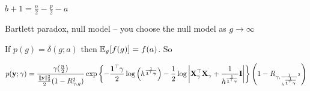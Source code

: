 \documentclass{amsart}
\begin{document}
$b + 1 = \frac{n}{2} - \frac{p}{2} - a$

Bartlett paradox, null model -- you choose the null model as $g \to \infty$

If $p(g) = \delta(g; a)$ then $\mathbb{E}_g[f(g)] = f(a)$. So

\begin{align*}
p({\bf y}; \gamma) = \frac{\gamma(\frac{n}{2})}{\frac{\|{\bf y}\|_2^2}{2}(1 - R_{\gamma, g}^2)}
									\exp\left \{ -\frac{{\bf 1}^\top \gamma}{2} \log \left ( h^{\frac{1}{{\bf 1}^\top {\boldsymbol\gamma}}} \right )
													- \frac{1}{2} \log\left |{\bf X}_\gamma^\top {\bf X}_\gamma + \frac{1}{h^{\frac{1}{{\bf 1}^\top {\boldsymbol\gamma}}}} {\bf I} \right | \right \} \left (1 - R_{\gamma, \frac{1}{h^{\frac{1}{{\bf 1}^\top {\boldsymbol\gamma}}}}^2} \right )
\end{align*}
\end{document}

